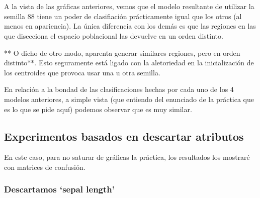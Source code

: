 \documentclass[11pt]{article}
\begin{document}
    \begin{center}
    \end{center}
    { \hspace*{\fill} \\}
    
    \begin{center}
    \end{center}
    { \hspace*{\fill} \\}
    
    A la vista de las gráficas anteriores, vemos que el modelo resultante de
utilizar la semilla 88 tiene un poder de clasifiación prácticamente
igual que los otros (al menos en apariencia). La única diferencia con
los demás es que las regiones en las que disecciona el espacio
poblacional las devuelve en un orden distinto.

** O dicho de otro modo, aparenta generar similares regiones, pero en
orden distinto**. Esto seguramente está ligado con la aletoriedad en la
inicialización de los centroides que provoca usar una u otra semilla.

En relación a la bondad de las clasificaciones hechas por cada uno de
los 4 modelos anteriores, a simple vista (que entiendo del enunciado de
la práctica que es lo que se pide aquí) podemos observar que es muy
similar.

\subsection{Experimentos basados en descartar
atributos}\label{experimentos-basados-en-descartar-atributos}

En este caso, para no saturar de gráficas la práctica, los resultados
los mostraré con matrices de confusión.

\subsubsection{\texorpdfstring{Descartamos `sepal
length'}{Descartamos sepal length}}\label{descartamos-sepal-length}
\end{document}
